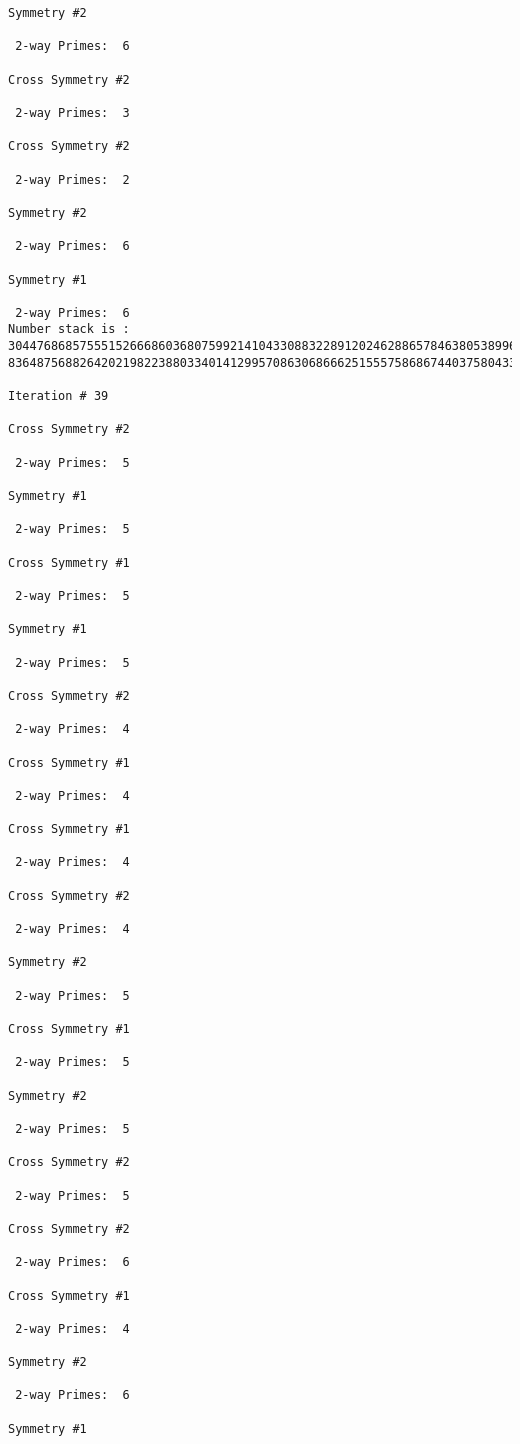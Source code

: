 \begin{verbatim}
Symmetry #2

 2-way Primes: 	6

Cross Symmetry #2

 2-way Primes: 	3

Cross Symmetry #2

 2-way Primes: 	2

Symmetry #2

 2-way Primes: 	6

Symmetry #1

 2-way Primes: 	6
Number stack is :
30447686857555152666860368075992141043308832289120246288657846380538996794608835958544046240163340857
83648756882642021982238803340141299570863068666251555758686744037580433610426404458595388064976998350

Iteration #	39

Cross Symmetry #2

 2-way Primes: 	5

Symmetry #1

 2-way Primes: 	5

Cross Symmetry #1

 2-way Primes: 	5

Symmetry #1

 2-way Primes: 	5

Cross Symmetry #2

 2-way Primes: 	4

Cross Symmetry #1

 2-way Primes: 	4

Cross Symmetry #1

 2-way Primes: 	4

Cross Symmetry #2

 2-way Primes: 	4

Symmetry #2

 2-way Primes: 	5

Cross Symmetry #1

 2-way Primes: 	5

Symmetry #2

 2-way Primes: 	5

Cross Symmetry #2

 2-way Primes: 	5

Cross Symmetry #2

 2-way Primes: 	6

Cross Symmetry #1

 2-way Primes: 	4

Symmetry #2

 2-way Primes: 	6

Symmetry #1


\end{verbatim}
